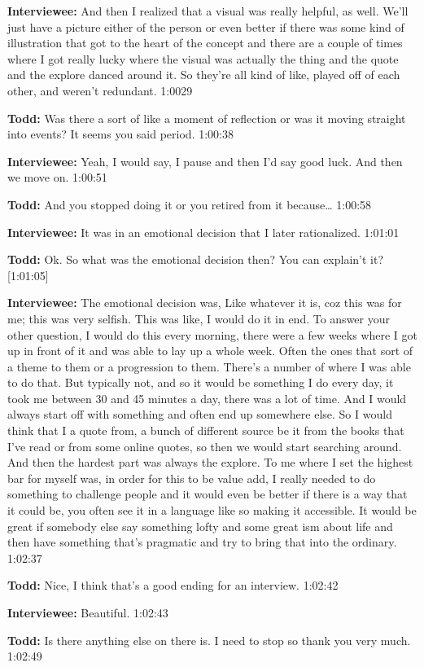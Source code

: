 \textbf{Interviewee:}  	And then I realized that a visual was really helpful, as well.  We'll just have a picture either of the person or even better if there was some kind of illustration that got to the heart of the concept and there are a couple of times where I got really lucky where the visual was actually the thing and the quote and the explore danced around it.  So they're all kind of like, played off of each other, and weren't redundant.  1:0029

\textbf{Todd:}  	Was there a sort of like a moment of reflection or was it moving straight into events?  It seems you said period.  1:00:38

\textbf{Interviewee:}  	Yeah, I would say, I pause and then I'd say good luck. And then we move on.  1:00:51

\textbf{Todd:}  	And you stopped doing it or you retired from it because…  1:00:58

\textbf{Interviewee:} 	It was in an emotional decision that I later rationalized.  1:01:01

\textbf{Todd:}  	Ok.  So what was the emotional decision then?  You can explain't it?  [1:01:05]

\textbf{Interviewee:}   	The emotional decision was,   Like whatever it is, coz this was for me; this was very selfish.  This was like, I would do it in end. To answer your other question, I would do this every morning, there were a few weeks where I got up in front of it and was able to lay up a whole week. Often the ones that sort of a theme to them or a progression to them.  There's a number of where I was able to do that. But typically not, and so it would be something I do every day, it took me between 30 and 45 minutes a day, there was a lot of time.  And I would always start off with something and often end up somewhere else. So I would think that I a quote from, a bunch of different source be it from the books that I've read or from some online quotes, so then we would start searching around.  And then the hardest part was always the explore.  To me where I set the highest bar for myself was, in order for this to be value add, I really needed to do something to challenge people and it would even be better if there is a way that it could be, you often see it in a language like  so making it accessible.  It would be great if somebody else say something lofty and some great ism about life and then have something that's pragmatic and try to bring that into the ordinary.   1:02:37

\textbf{Todd:}	Nice, I think that's a good ending for an interview.  1:02:42

\textbf{Interviewee:}  	Beautiful.  1:02:43

\textbf{Todd:}  	Is there anything else on there is.  I need to stop so thank you very much.  1:02:49
